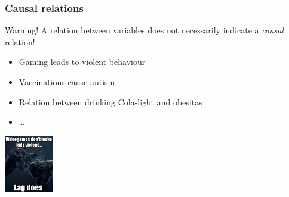\documentclass{beamer}
\begin{document}
\begin{frame}
  \frametitle{Causal relations}

  \begin{alertblock}{Warning!}
      A relation between variables does not necessarily indicate a \emph{causal} relation!
  \end{alertblock}

  \begin{itemize}
    \item Gaming leads to violent behaviour
    \item Vaccinations cause autism
    \item Relation between drinking Cola-light and obesitas
    \item \ldots
  \end{itemize}

  \begin{center}
    \includegraphics[height=2.5cm]{img/les1-10}
  \end{center}
\end{frame}
\end{document}

